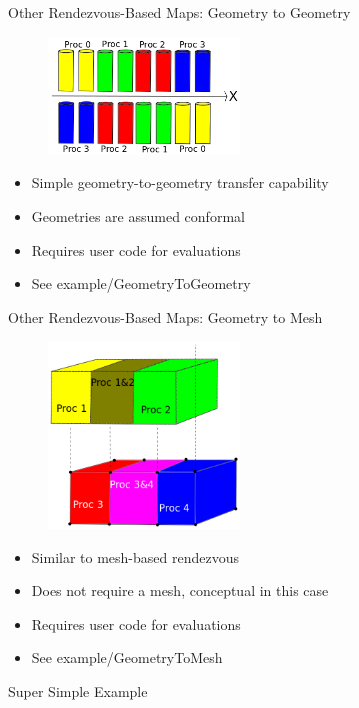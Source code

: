 \documentclass{beamer}
\begin{document}
\begin{frame}{Other Rendezvous-Based Maps: Geometry to Geometry}

  \begin{figure}
    \centering
    \includegraphics[width=2in]{volumetovolume.png}
  \end{figure}

  \begin{itemize}
  \item Simple geometry-to-geometry transfer capability
    \medskip
  \item Geometries are assumed conformal
    \medskip
  \item Requires user code for evaluations
    \medskip
  \item See example/GeometryToGeometry
  \end{itemize}

\end{frame}

\begin{frame}{Other Rendezvous-Based Maps: Geometry to Mesh}

  \begin{figure}
    \centering
    \includegraphics[width=2in]{volumetomesh.png}
  \end{figure}

  \begin{itemize}
  \item Similar to mesh-based rendezvous
    \medskip
  \item Does not require a mesh, conceptual in this case
    \medskip
  \item Requires user code for evaluations
    \medskip
  \item See example/GeometryToMesh
  \end{itemize}

\end{frame}

\begin{frame}{Super Simple Example}

\end{frame}

\end{document}
